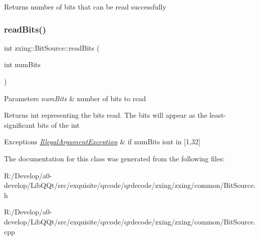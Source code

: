 \begin{DoxyReturn}{Returns}
number of bits that can be read successfully 
\end{DoxyReturn}
\mbox{\label{classzxing_1_1_bit_source_abe5162247749e9d9eeb9afcec8738252}} 
\subsubsection{\texorpdfstring{read\+Bits()}{readBits()}}
{\footnotesize\ttfamily int zxing\+::\+Bit\+Source\+::read\+Bits (\begin{DoxyParamCaption}\item[{int}]{num\+Bits }\end{DoxyParamCaption})}


\begin{DoxyParams}{Parameters}
{\em num\+Bits} & number of bits to read \\
\hline
\end{DoxyParams}
\begin{DoxyReturn}{Returns}
int representing the bits read. The bits will appear as the least-\/significant bits of the int 
\end{DoxyReturn}

\begin{DoxyExceptions}{Exceptions}
{\em \mbox{\hyperlink{classzxing_1_1_illegal_argument_exception}{Illegal\+Argument\+Exception}}} & if num\+Bits isn\textquotesingle{}t in \mbox{[}1,32\mbox{]} \\
\hline
\end{DoxyExceptions}


The documentation for this class was generated from the following files\+:\begin{DoxyCompactItemize}
\item 
R\+:/\+Develop/a0-\/develop/\+Lib\+Q\+Qt/src/exquisite/qrcode/qrdecode/zxing/zxing/common/Bit\+Source.\+h\item 
R\+:/\+Develop/a0-\/develop/\+Lib\+Q\+Qt/src/exquisite/qrcode/qrdecode/zxing/zxing/common/Bit\+Source.\+cpp\end{DoxyCompactItemize}
